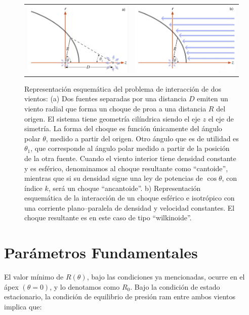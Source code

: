 \begin{figure}
  \centering
  \begin{tabular}{lr}
    \includegraphics[width=0.45\linewidth]{./Figures/bowshock-crw-variables} &
    \includegraphics[width=0.45\linewidth]{./Figures/wilkinoid}
  \end{tabular}
  \caption[Representación esquemática del problema de interacción de dos vientos]{Representación esquemática del problema de interacción de dos vientos: (a) Dos fuentes separadas por una distancia $D$ emiten un viento radial que forma un choque de proa a una distancia $R$ del origen. El sistema tiene geometría cilíndrica siendo el eje $z$ el eje de simetría. La forma del choque es función únicamente del ángulo polar $\theta$, medido a partir del origen. Otro ángulo que es de utilidad es $\theta_1$, que corresponde al ángulo polar medido a partir de la posición de la otra fuente. Cuando el viento interior tiene densidad constante y es esférico, denominamos al choque resultante como ``cantoide'', mientras que si su densidad sigue una ley de potencias de $\cos\theta$, con índice $k$, será un choque ``ancantoide''. b) Representación esquemática de la interacción de un choque esférico e isotrópico con una corriente plano--paralela de densidad y velocidad constantes. El choque resultante es en este caso de tipo ``wilkinoide''.}
    \label{fig:crw-esquema}
\end{figure}

\section{Parámetros Fundamentales}
\label{sec:fundamental-parameters}
El valor mínimo de $R(\theta)$, bajo las condiciones ya mencionadas, ocurre en el ápex $(\theta=0)$, y lo denotamos como $R_0$. Bajo la condición de estado estacionario, la condición de equilibrio de presión ram entre ambos vientos implica que:

